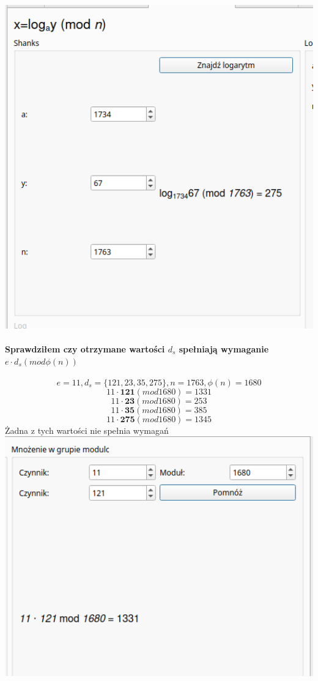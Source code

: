 \documentclass{article}[12pt]
\begin{document}
\includegraphics[width=1\textwidth]{twelve.png} \\ 
\paragraph{Sprawdziłem czy otrzymane wartości $d_s$ spełniają wymaganie $e \cdot d_s (mod \phi(n))$ \\}
\[ e = 11, d_s = \{ 121, 23, 35, 275 \}, n = 1763, \phi(n) = 1680 \]
\[ 11 \cdot \mathbf{121} (mod 1680) = 1331 \] 
\[ 11 \cdot \mathbf{23} (mod 1680) = 253 \] 
\[ 11 \cdot \mathbf{35} (mod 1680) = 385 \] 
\[ 11 \cdot \mathbf{275} (mod 1680) = 1345  \] 
Żadna z tych wartości nie spełnia wymagań
\includegraphics[width=1\textwidth]{thirteen.png} 
\end{document}
